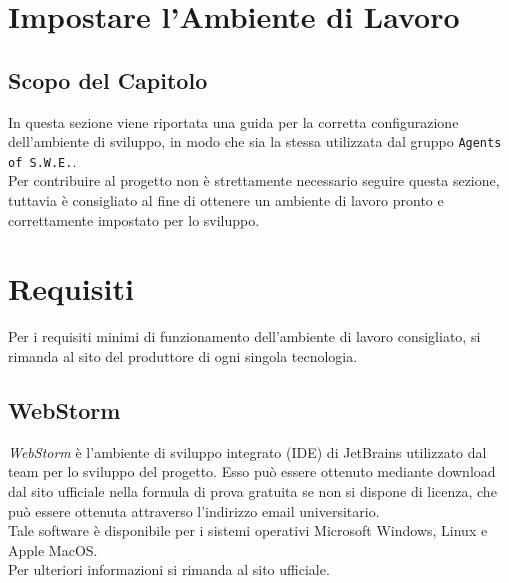 \section{Impostare l'Ambiente di Lavoro}\label{AmbienteLavoro}
\subsection{Scopo del Capitolo}\label{AmbienteLavoro_scopo}
In questa sezione viene riportata una guida per la corretta configurazione dell'ambiente di sviluppo, in modo che sia la stessa utilizzata dal gruppo \texttt{Agents of S.W.E.}.\\
Per contribuire al progetto non è strettamente necessario seguire questa sezione, tuttavia è consigliato al fine di ottenere un ambiente di lavoro pronto e correttamente impostato per lo sviluppo.

\section{Requisiti}\label{AmbienteLavoro_requisiti}
Per i requisiti minimi di funzionamento dell'ambiente di lavoro consigliato, si rimanda al sito del produttore di ogni singola tecnologia.

\subsection{WebStorm}\label{webstorm}
\textit{WebStorm} è l'ambiente di sviluppo integrato (IDE) di JetBrains utilizzato dal team per lo sviluppo del progetto. Esso può essere ottenuto mediante download dal sito ufficiale nella formula di prova gratuita se non si dispone di licenza, che può essere ottenuta attraverso l'indirizzo email universitario.\\
Tale software è disponibile per i sistemi operativi Microsoft Windows, Linux e Apple MacOS.\\
Per ulteriori informazioni si rimanda al sito ufficiale.

